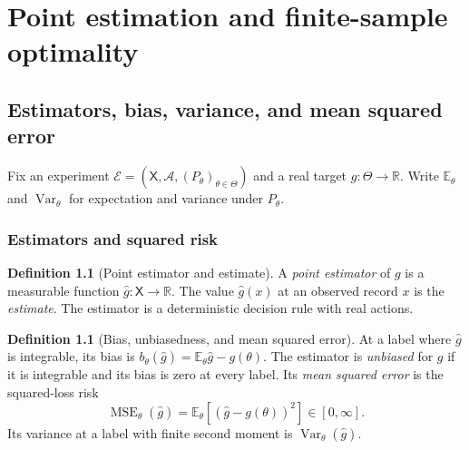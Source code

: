 \documentclass[11pt,oneside]{book}
\theoremstyle{definition}
\newtheorem{definition}[theorem]{Definition}
\theoremstyle{remark}
\newcommand{\R}{\mathbb R}
\begin{document}
\chapter{Point estimation and finite-sample optimality}
\label{chap:point-estimation}
\section{Estimators, bias, variance, and mean squared error}
\label{sec:estimators-bias-variance}

Fix an experiment $\mathcal E=(\mathsf X,\mathcal A,
(P_\theta)_{\theta\in\Theta})$ and a real target $g:\Theta\to\R$.
Write $\mathbb E_\theta$ and $\operatorname{Var}_\theta$ for
expectation and variance under $P_\theta$.

\subsection{Estimators and squared risk}
\label{subsec:point-estimators}

\begin{definition}[Point estimator and estimate]
\label{def:point-estimator}
A \emph{point estimator} of $g$ is a measurable function
$\widehat g:\mathsf X\to\R$. The value $\widehat g(x)$ at an
observed record $x$ is the \emph{estimate}. The estimator is a
deterministic decision rule with real actions.
\end{definition}

\begin{definition}[Bias, unbiasedness, and mean squared error]
\label{def:bias-mse}
At a label where $\widehat g$ is integrable, its bias is
$b_\theta(\widehat g)=\mathbb E_\theta\widehat g-g(\theta)$.
The estimator is \emph{unbiased} for $g$ if it is integrable
and its bias is zero at every label. Its \emph{mean squared error}
is the squared-loss risk
\[
\operatorname{MSE}_\theta(\widehat g)
=\mathbb E_\theta[(\widehat g-g(\theta))^2]\in[0,\infty].
\]
Its variance at a label with finite second moment is
$\operatorname{Var}_\theta(\widehat g)$.
\end{definition}
\end{document}
